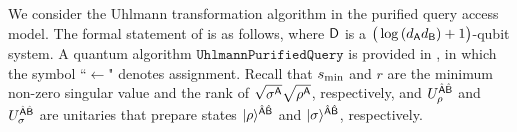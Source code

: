 


We consider the Uhlmann transformation algorithm in the purified query access model.
The formal statement of  is as follows, where ${\mathsf{D}}$ is a $\big(\log{(d_{\mathsf{A}}d_{\mathsf{B}})} + 1\big)$-qubit system. 
A quantum algorithm $\mathtt{UhlmannPurifiedQuery}$ is provided in , in which the symbol ``$\gets$" denotes assignment.
Recall that $s_{\rm min}$ and $r$ are the minimum non-zero singular value and the rank of $\sqrt{\sigma^{\mathsf{A}}}\sqrt{\rho^{\mathsf{A}}}$, respectively, and $U_\rho^{\hat{{\mathsf{A}}}\hat{{\mathsf{B}}}}$ and $U_\sigma^{\hat{{\mathsf{A}}}\hat{{\mathsf{B}}}}$ are unitaries that prepare states $|\rho\rangle^{\hat{{\mathsf{A}}}\hat{{\mathsf{B}}}}$ and $|\sigma\rangle^{\hat{{\mathsf{A}}}\hat{{\mathsf{B}}}}$, respectively.






